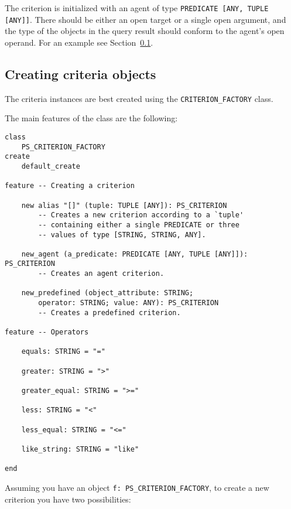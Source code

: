 \documentclass[a4paper,12pt]{report}
\begin{document}
The criterion is initialized with an agent of type \lstinline!PREDICATE [ANY, TUPLE [ANY]]!. 
There should be either an open target or a single open argument, and the type of the objects in the query result should conform to the agent's open operand. For an example see Section~\ref{sec:creating_criteria_objects}.

\subsection{Creating criteria objects}
\label{sec:creating_criteria_objects}
The criteria instances are best created using the \lstinline!CRITERION_FACTORY! class.

The main features of the class are the following: 

\begin{lstlisting}[language=OOSC2Eiffel, captionpos=b, caption={The CRITERION\_FACTORY class interface}, label={lst:factory_interface}]
class
	PS_CRITERION_FACTORY
create
	default_create

feature -- Creating a criterion

	new alias "[]" (tuple: TUPLE [ANY]): PS_CRITERION
		-- Creates a new criterion according to a `tuple'
		-- containing either a single PREDICATE or three 
		-- values of type [STRING, STRING, ANY].

	new_agent (a_predicate: PREDICATE [ANY, TUPLE [ANY]]): PS_CRITERION
		-- Creates an agent criterion.

	new_predefined (object_attribute: STRING; 
		operator: STRING; value: ANY): PS_CRITERION
		-- Creates a predefined criterion.

feature -- Operators

	equals: STRING = "="

	greater: STRING = ">"

	greater_equal: STRING = ">="

	less: STRING = "<"

	less_equal: STRING = "<="

	like_string: STRING = "like"

end
\end{lstlisting}

Assuming you have an object \lstinline{f: PS_CRITERION_FACTORY}, to create a new criterion you have  two possibilities:
\end{document}
